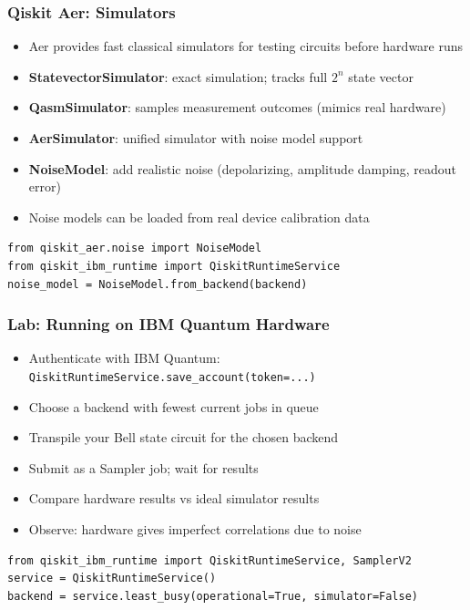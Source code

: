 \begin{frame}[fragile]\frametitle{Qiskit Aer: Simulators}
\begin{itemize}
\item Aer provides fast classical simulators for testing circuits before hardware runs
\item \textbf{StatevectorSimulator}: exact simulation; tracks full $2^n$ state vector
\item \textbf{QasmSimulator}: samples measurement outcomes (mimics real hardware)
\item \textbf{AerSimulator}: unified simulator with noise model support
\item \textbf{NoiseModel}: add realistic noise (depolarizing, amplitude damping, readout error)
\item Noise models can be loaded from real device calibration data
\end{itemize}
\begin{verbatim}
from qiskit_aer.noise import NoiseModel
from qiskit_ibm_runtime import QiskitRuntimeService
noise_model = NoiseModel.from_backend(backend)
\end{verbatim}
\end{frame}

\begin{frame}[fragile]\frametitle{Lab: Running on IBM Quantum Hardware}
\begin{itemize}
\item Authenticate with IBM Quantum: \texttt{QiskitRuntimeService.save\_account(token=...)}
\item Choose a backend with fewest current jobs in queue
\item Transpile your Bell state circuit for the chosen backend
\item Submit as a Sampler job; wait for results
\item Compare hardware results vs ideal simulator results
\item Observe: hardware gives imperfect correlations due to noise
\end{itemize}
\begin{verbatim}
from qiskit_ibm_runtime import QiskitRuntimeService, SamplerV2
service = QiskitRuntimeService()
backend = service.least_busy(operational=True, simulator=False)
\end{verbatim}
\end{frame}

